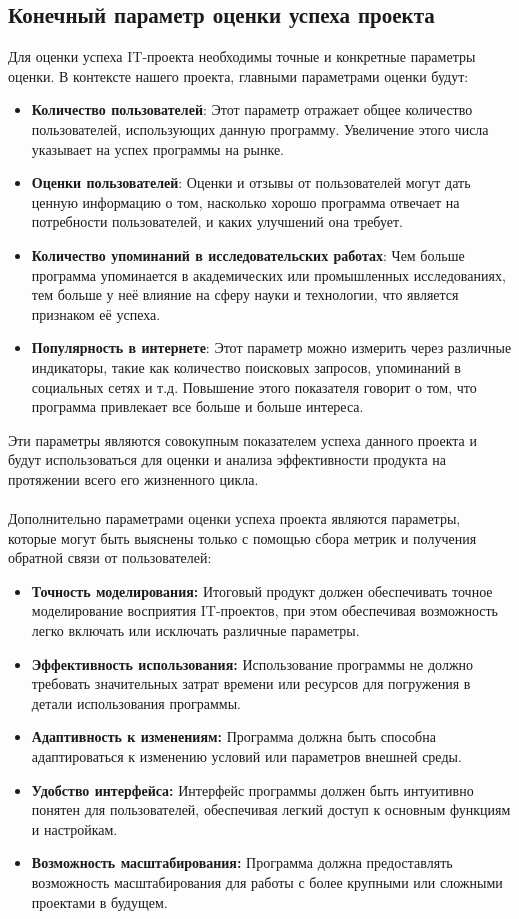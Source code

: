 \documentclass{article}
\begin{document}
    \subsection {Конечный параметр оценки успеха проекта}
    Для оценки успеха IT-проекта необходимы точные и конкретные параметры оценки. В контексте нашего проекта, главными параметрами оценки будут:
    \begin{itemize}
        \item \textbf{Количество пользователей}: Этот параметр отражает общее количество пользователей, использующих данную программу. Увеличение этого числа указывает на успех программы на рынке.
        \item \textbf{Оценки пользователей}: Оценки и отзывы от пользователей могут дать ценную информацию о том, насколько хорошо программа отвечает на потребности пользователей, и каких улучшений она требует.
        \item \textbf{Количество упоминаний в исследовательских работах}: Чем больше программа упоминается в академических или промышленных исследованиях, тем больше у неё влияние на сферу науки и технологии, что является признаком её успеха.
        \item \textbf{Популярность в интернете}: Этот параметр можно измерить через различные индикаторы, такие как количество поисковых запросов, упоминаний в социальных сетях и т.д. Повышение этого показателя говорит о том, что программа привлекает все больше и больше интереса.
    \end{itemize}
    Эти параметры являются совокупным показателем успеха данного проекта и будут использоваться для оценки и анализа эффективности продукта на протяжении всего его жизненного цикла.\\
    ~\\
    Дополнительно параметрами оценки успеха проекта являются параметры, которые могут быть выяснены только с помощью сбора метрик и получения обратной связи от пользователей:
    \begin{itemize}
        \item \textbf{Точность моделирования:} Итоговый продукт должен обеспечивать точное моделирование восприятия IT-проектов, при этом обеспечивая возможность легко включать или исключать различные параметры.
        \item \textbf{Эффективность использования:} Использование программы не должно требовать значительных затрат времени или ресурсов для погружения в детали использования программы.
        \item \textbf{Адаптивность к изменениям:} Программа должна быть способна адаптироваться к изменению условий или параметров внешней среды.
        \item \textbf{Удобство интерфейса:} Интерфейс программы должен быть интуитивно понятен для пользователей, обеспечивая легкий доступ к основным функциям и настройкам.
        \item \textbf{Возможность масштабирования:} Программа должна предоставлять возможность масштабирования для работы с более крупными или сложными проектами в будущем.
    \end{itemize}
\end{document}
